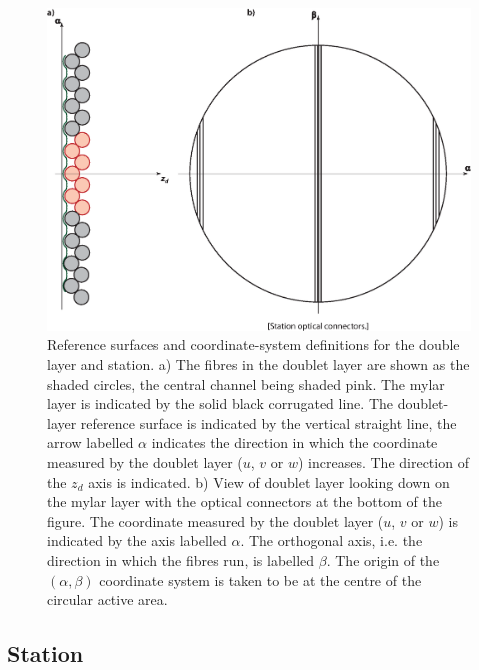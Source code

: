 \begin{figure}
  \begin{center}
    \includegraphics[width=0.7\linewidth]
      {03-Reference-surfaces-and-coordinate-systems/Figures/doublet-layer.eps}
  \end{center}
  \caption{
    Reference surfaces and coordinate-system definitions for the
    double layer and station.
    a) The fibres in the doublet layer are shown as the shaded
    circles, the central channel being shaded pink.
    The mylar layer is indicated by the solid black corrugated line.
    The doublet-layer reference surface is indicated by the vertical
    straight line, the arrow labelled $\alpha$ indicates the direction
    in which the coordinate measured by the doublet layer ($u$, $v$ or
    $w$) increases.
    The direction of the $z_d$ axis is indicated.
    b) View of doublet layer looking down on the mylar layer with the
    optical connectors at the bottom of the figure.
    The coordinate measured by the doublet layer ($u$, $v$ or $w$) is
    indicated by the axis labelled $\alpha$.
    The orthogonal axis, i.e. the direction in which the fibres
    run, is labelled $\beta$.
    The origin of the $(\alpha, \beta)$ coordinate system is taken to
    be at the centre of the circular active area.
  }
  \label{Fig:DblLyrRef&Coord}
\end{figure}

\subsection{Station}
\label{SubSect:RefCoordStn}

